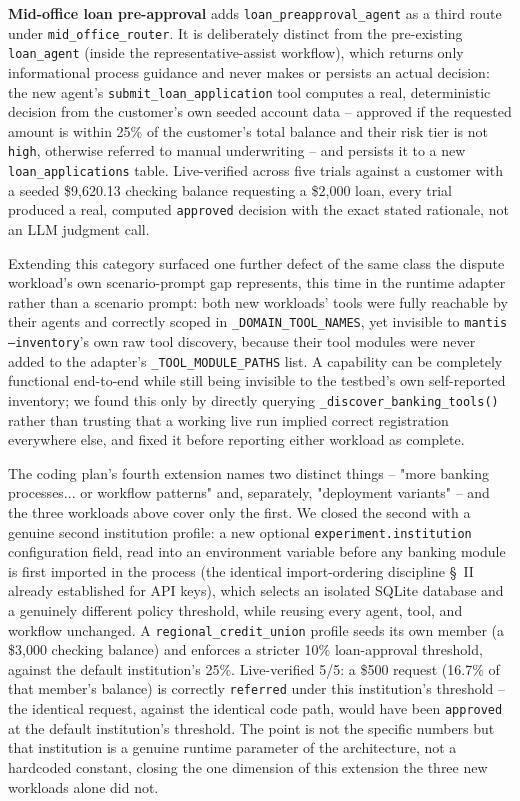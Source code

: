 \documentclass[conference]{IEEEtran}
\begin{document}
\textbf{Mid-office loan pre-approval} adds \texttt{loan\_preapproval\_agent} as a third route under \texttt{mid\_office\_router}. It is deliberately distinct from the pre-existing \texttt{loan\_agent} (inside the representative-assist workflow), which returns only informational process guidance and never makes or persists an actual decision: the new agent's \texttt{submit\_loan\_application} tool computes a real, deterministic decision from the customer's own seeded account data -- approved if the requested amount is within 25\% of the customer's total balance and their risk tier is not \texttt{high}, otherwise referred to manual underwriting -- and persists it to a new \texttt{loan\_applications} table. Live-verified across five trials against a customer with a seeded \$9{,}620.13 checking balance requesting a \$2{,}000 loan, every trial produced a real, computed \texttt{approved} decision with the exact stated rationale, not an LLM judgment call.

Extending this category surfaced one further defect of the same class the dispute workload's own scenario-prompt gap represents, this time in the runtime adapter rather than a scenario prompt: both new workloads' tools were fully reachable by their agents and correctly scoped in \texttt{\_DOMAIN\_TOOL\_NAMES}, yet invisible to \texttt{mantis --inventory}'s own raw tool discovery, because their tool modules were never added to the adapter's \texttt{\_TOOL\_MODULE\_PATHS} list. A capability can be completely functional end-to-end while still being invisible to the testbed's own self-reported inventory; we found this only by directly querying \texttt{\_discover\_banking\_tools()} rather than trusting that a working live run implied correct registration everywhere else, and fixed it before reporting either workload as complete.

The coding plan's fourth extension names two distinct things -- "more banking processes... or workflow patterns" and, separately, "deployment variants" -- and the three workloads above cover only the first. We closed the second with a genuine second institution profile: a new optional \texttt{experiment.institution} configuration field, read into an environment variable before any banking module is first imported in the process (the identical import-ordering discipline \S~II already established for API keys), which selects an isolated SQLite database and a genuinely different policy threshold, while reusing every agent, tool, and workflow unchanged. A \texttt{regional\_credit\_union} profile seeds its own member (a \$3{,}000 checking balance) and enforces a stricter 10\% loan-approval threshold, against the default institution's 25\%. Live-verified 5/5: a \$500 request (16.7\% of that member's balance) is correctly \texttt{referred} under this institution's threshold -- the identical request, against the identical code path, would have been \texttt{approved} at the default institution's threshold. The point is not the specific numbers but that institution is a genuine runtime parameter of the architecture, not a hardcoded constant, closing the one dimension of this extension the three new workloads alone did not.
\end{document}
